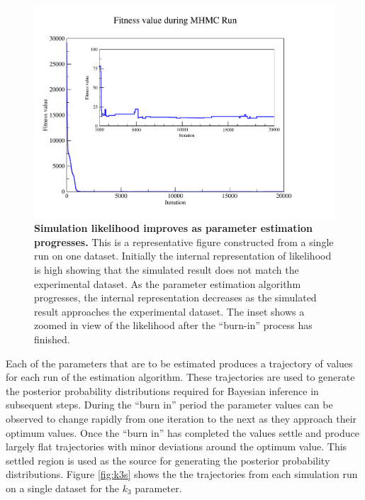 \begin{figure}[p]
 \centering
 \includegraphics[width=14cm, trim=75px 50px 125px 25px]{./05-oxygenreduction/data/o2_fitness.pdf}
 \caption[Simulation likelihood improves as parameter estimation progresses]{{\bf Simulation likelihood improves as parameter estimation progresses.} This is a representative figure constructed from a single run on one dataset. Initially the internal representation of likelihood is high showing that the simulated result does not match the experimental dataset. As the parameter estimation algorithm progresses, the internal representation decreases as the simulated result approaches the experimental dataset. The inset shows a zoomed in view of the likelihood after the ``burn-in'' process has finished.
 \label{fig:oxy_fitness}}
\end{figure}
\afterpage{\clearpage}

Each of the parameters that are to be estimated produces a trajectory of values for each run of the estimation algorithm. These trajectories are used to generate the posterior probability distributions required for Bayesian inference in subsequent steps. During the ``burn in'' period the parameter values can be observed to change rapidly from one iteration to the next as they approach their optimum values. Once the ``burn in'' has completed the values settle and produce largely flat trajectories with minor deviations around the optimum value. This settled region is used as the source for generating the posterior probability distributions. Figure \ref{fig:k3s} shows the the trajectories from each simulation run on a single dataset for the $k_3$ parameter.

